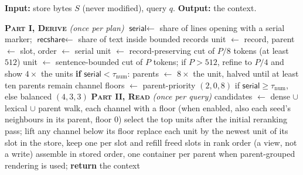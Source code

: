\documentclass{article}
\newcommand{\sys}{\textsc{Muster}}
\newcommand{\serial}{\textsf{serial}}
\newcommand{\cov}{\textsf{recshare}}
\begin{document}
\begin{algorithm}[H]
\small
\caption{\sys{}. Part~I runs detection, including the policy gate (step~11), once per plan with no model. On MemoryAgentBench, the original implementation derives a representation for each cell from its first up to three stores. Part~II (retrieval and context assembly) uses one query embedding, an initial rerank and one reader call per query. The SDK's numbered-fact walk can add rerank rounds. $\tau_{\mathrm{num}}=0.80$ and $\tau_{\mathrm{rec}}=0.90$, and $P$ is the benchmark's chunk ($512$ or $4096$, Table~\ref{tab:hyper}). LongMemEval keeps its delivered rounds and sessions as units and parents (Section~\ref{sec:rule}).}
\label{alg:muster}
\footnotesize
\textbf{Input:} store bytes $S$ (never modified), query $q$. \textbf{Output:} the context.
\begin{algorithmic}[1]
\STATE \textbf{\textsc{Part I, Derive}} \emph{(once per plan)}
\STATE $\serial \gets$ share of lines opening with a serial marker; $\cov \gets$ share of text inside bounded records
\IF{$\serial \ge \tau_{\mathrm{num}}$}
  \STATE unit $\gets$ record, parent $\gets$ slot, order $\gets$ serial
\ELSIF{$\cov \ge \tau_{\mathrm{rec}}$}
  \STATE unit $\gets$ record-preserving cut of $P/8$ tokens (at least $512$)
\ELSE
  \STATE unit $\gets$ sentence-bounded cut of $P$ tokens; if $P>512$, refine to $P/4$ and show $4\times$ the units
\ENDIF
\STATE \textbf{if} $\serial < \tau_{\mathrm{num}}$: parents $\gets$ $8\times$ the unit, halved until at least ten parents remain
\STATE channel floors $\gets$ parent-priority $(2,0,8)$ if $\serial \ge \tau_{\mathrm{num}}$, else balanced $(4,3,3)$
\STATE \textbf{\textsc{Part II, Read}} \emph{(once per query)}
\STATE candidates $\gets$ dense $\cup$ lexical $\cup$ parent walk, each channel with a floor (when enabled, also each seed's neighbours in its parent, floor $0$)
\STATE select the top units after the initial reranking pass; lift any channel below its floor\label{alg:lift}
 \STATE replace each unit by the newest unit of its slot in the store, keep one per slot and refill freed slots in rank order (a view, not a write) \ENDIF
\STATE assemble in stored order, one container per parent when parent-grouped rendering is used; \textbf{return} the context
\end{algorithmic}
\end{algorithm}
\end{document}
